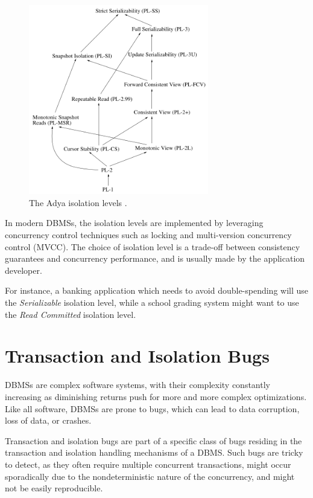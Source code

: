 \begin{figure}[H]
    \centering
    \includegraphics[width=0.7\textwidth]{assets/adya_isolation_levels.png}
    \caption{The Adya isolation levels \cite{adya1999weak}.}
    \label{fig:adya_isolation_levels}
\end{figure}

In modern DBMSs, the isolation levels are implemented by leveraging concurrency control techniques such as locking and multi-version concurrency control (MVCC). The choice of isolation level is a trade-off between consistency guarantees and concurrency performance, and is usually made by the application developer.

For instance, a banking application which needs to avoid double-spending will use the \textit{Serializable} isolation level, while a school grading system might want to use the \textit{Read Committed} isolation level.

\section{Transaction and Isolation Bugs}

DBMSs are complex software systems, with their complexity constantly increasing as diminishing returns push for more and more complex optimizations. Like all software, DBMSs are prone to bugs, which can lead to data corruption, loss of data, or crashes.

Transaction and isolation bugs are part of a specific class of bugs residing in the transaction and isolation handling mechanisms of a DBMS. Such bugs are tricky to detect, as they often require multiple concurrent transactions, might occur sporadically due to the nondeterministic nature of the concurrency, and might not be easily reproducible.

